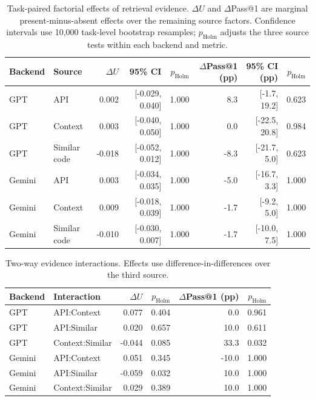\begin{table}[t]
\centering
\small
\caption{Task-paired factorial effects of retrieval evidence. $\Delta U$ and $\Delta$Pass@1 are marginal present-minus-absent effects over the remaining source factors. Confidence intervals use 10,000 task-level bootstrap resamples; $p_{\mathrm{Holm}}$ adjusts the three source tests within each backend and metric.}
\label{tab:source_factorial_effects}
\begin{tabular}{llrrrrrr}
\toprule
Backend & Source & $\Delta U$ & 95\% CI & $p_{\mathrm{Holm}}$ & $\Delta$Pass@1 (pp) & 95\% CI (pp) & $p_{\mathrm{Holm}}$ \\
\midrule
GPT & API & 0.002 & [-0.029, 0.040] & 1.000 & 8.3 & [-1.7, 19.2] & 0.623 \\
GPT & Context & 0.003 & [-0.040, 0.050] & 1.000 & 0.0 & [-22.5, 20.8] & 0.984 \\
GPT & Similar code & -0.018 & [-0.052, 0.012] & 1.000 & -8.3 & [-21.7, 5.0] & 0.623 \\
\midrule
Gemini & API & 0.003 & [-0.034, 0.035] & 1.000 & -5.0 & [-16.7, 3.3] & 1.000 \\
Gemini & Context & 0.009 & [-0.018, 0.039] & 1.000 & -1.7 & [-9.2, 5.0] & 1.000 \\
Gemini & Similar code & -0.010 & [-0.030, 0.007] & 1.000 & -1.7 & [-10.0, 7.5] & 1.000 \\
\bottomrule
\end{tabular}
\end{table}

\begin{table}[t]
\centering
\small
\caption{Two-way evidence interactions. Effects use difference-in-differences over the third source.}
\label{tab:source_interactions}
\begin{tabular}{llrrrr}
\toprule
Backend & Interaction & $\Delta U$ & $p_{\mathrm{Holm}}$ & $\Delta$Pass@1 (pp) & $p_{\mathrm{Holm}}$ \\
\midrule
GPT & API:Context & 0.077 & 0.404 & 0.0 & 0.961 \\
GPT & API:Similar & 0.020 & 0.657 & 10.0 & 0.611 \\
GPT & Context:Similar & -0.044 & 0.085 & 33.3 & 0.032 \\
\midrule
Gemini & API:Context & 0.051 & 0.345 & -10.0 & 1.000 \\
Gemini & API:Similar & -0.059 & 0.032 & 10.0 & 1.000 \\
Gemini & Context:Similar & 0.029 & 0.389 & 10.0 & 1.000 \\
\bottomrule
\end{tabular}
\end{table}
